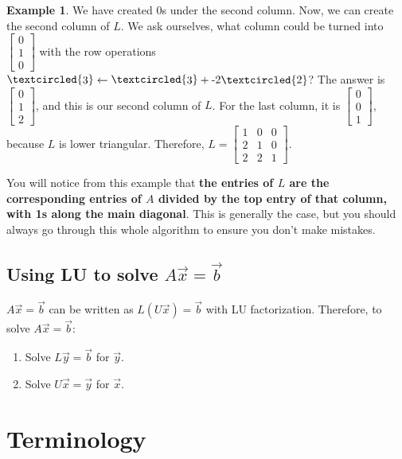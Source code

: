 \documentclass[a4paper,12pt]{article}
\theoremstyle{definition}
\theoremstyle{definition}
\newtheorem{example}{Example}[subsection]
\newcommand{\circlemath}[1]{\raisebox{0.5pt}{\textcircled{\raisebox{-.9pt} #1}}}
\newcommand{\replace}[3]{\circlemath{#1} \leftarrow \circlemath{#1} + \text{#3}\textcircled{#2}}
\newcommand{\mateq}[3]{#1#2 = #3}
\newcommand{\mateqaxb}{\mateq{A}{\vec{x}}{\vec{b}}}
\begin{document}
\begin{example}
		We have created 0s under the second column. Now, we can create the second column of $L$. We ask ourselves, what column could be turned into $\begin{bmatrix}
			0\\
			1\\
			0
		\end{bmatrix}$
		with the row operations
		$\replace{3}{2}{-2}$? The answer is $\begin{bmatrix}
			0\\
			1\\
			2
		\end{bmatrix}$, and this is our second column of $L$. For the last column, it is
		$\begin{bmatrix}
			0\\
			0\\
			1
		\end{bmatrix}$, because $L$ is lower triangular. Therefore, $L = \begin{bmatrix}
		1 & 0 & 0\\
		2 & 1 & 0\\
		2 & 2 & 1
		\end{bmatrix}$.
		
		You will notice from this example that \textbf{the entries of $L$ are the corresponding entries of $A$ divided by the top entry of that column, with 1s along the main diagonal}. This is generally the case, but you should always go through this whole algorithm to ensure you don't make mistakes.
	\end{example}
	
	\subsection{Using LU to solve $\mateqaxb$}
	\label{sec:axb-solve-lu-factor}
	$\mateqaxb$ can be written as $\mateq{L}{(U\vec{x})}{\vec{b}}$ with LU factorization. Therefore, to solve $\mateqaxb$:
	\begin{enumerate}		
		\item Solve $\mateq{L}{\vec{y}}{\vec{b}}$ for $\vec{y}$.
		
		\item Solve $\mateq{U}{\vec{x}}{\vec{y}}$ for $\vec{x}$.
	\end{enumerate}
	\newpage
	
	\section{Terminology}
\end{document}
